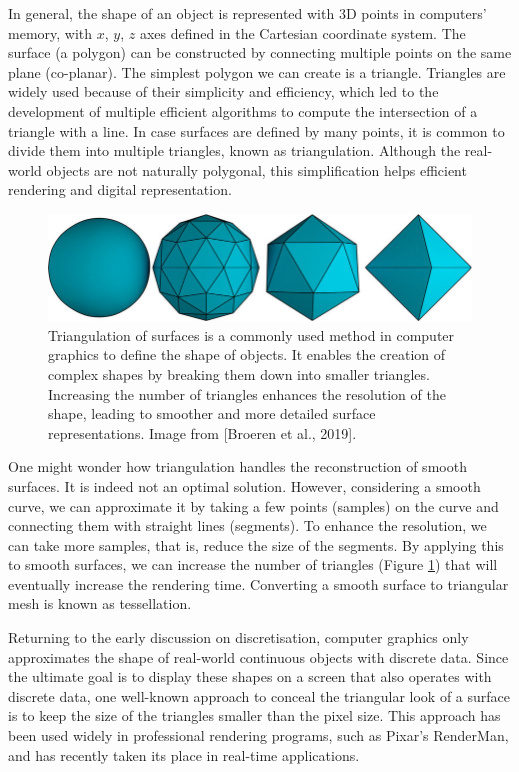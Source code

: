 In general, the shape of an object is represented with 3D points in computers' memory, with $x$, $y$, $z$ axes defined in the Cartesian coordinate system. The surface (a polygon) can be constructed by connecting multiple points on the same plane (co-planar). The simplest polygon we can create is a triangle. Triangles are widely used because of their simplicity and efficiency, which led to the development of multiple efficient algorithms to compute the intersection of a triangle with a line. In case surfaces are defined by many points, it is common to divide them into multiple triangles, known as triangulation. Although the real-world objects are not naturally polygonal, this simplification helps efficient rendering and digital representation.

\begin{figure}
  \centering
   \includegraphics[width=\linewidth]{Images/Triangulation-of-surfaces-Any-curved-surface-in-this-case-a-sphere-can-be-approximated.png}
   \caption{Triangulation of surfaces is a commonly used method in computer graphics to define the shape of objects. It enables the creation of complex shapes by breaking them down into smaller triangles. Increasing the number of triangles enhances the resolution of the shape, leading to smoother and more detailed surface representations. Image from [Broeren et al., 2019].}
   \label{fig:triangulation}
\end{figure}

One might wonder how triangulation handles the reconstruction of smooth surfaces. It is indeed not an optimal solution. However, considering a smooth curve, we can approximate it by taking a few points (samples) on the curve and connecting them with straight lines (segments). To enhance the resolution, we can take more samples, that is, reduce the size of the segments. By applying this to smooth surfaces, we can increase the number of triangles (Figure \ref{fig:triangulation}) that will eventually increase the rendering time. Converting a smooth surface to triangular mesh is known as tessellation.

Returning to the early discussion on discretisation, computer graphics only approximates the shape of real-world continuous objects with discrete data. Since the ultimate goal is to display these shapes on a screen that also operates with discrete data, one well-known approach to conceal the triangular look of a surface is to keep the size of the triangles smaller than the pixel size. This approach has been used widely in professional rendering programs, such as Pixar's RenderMan, and has recently taken its place in real-time applications.


